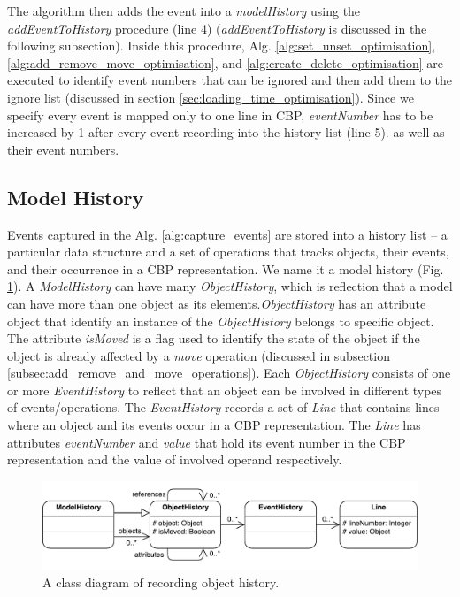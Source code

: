 \documentclass{llncs}
\begin{document}
The algorithm then adds the event into a \emph{modelHistory} using the \emph{addEventToHistory} procedure (line 4) (\emph{addEventToHistory} is discussed in the following subsection). Inside this procedure, Alg. \ref{alg:set_unset_optimisation}, \ref{alg:add_remove_move_optimisation}, and  \ref{alg:create_delete_optimisation} are executed to identify event numbers that can be ignored and then add them to the ignore list (discussed in section \ref{sec:loading_time_optimisation}). Since we specify every event is mapped only to one line in CBP, \emph{eventNumber} has to be increased by 1 after every event recording into the history list (line 5). as well as their event numbers.

\subsection{Model History}
\label{subsec:model_history}
Events captured in the Alg. \ref{alg:capture_events} are stored into a  history list -- a particular data structure and a set of operations that tracks objects, their events, and their  occurrence in a CBP representation. We name it a model history (Fig. \ref{fig:object_history}). A \emph{ModelHistory} can have many \emph{ObjectHistory}, which is reflection that a model can have more than one object as its elements.\emph{ObjectHistory} has an attribute object that identify an instance of the \emph{ObjectHistory} belongs to specific object. The attribute \emph{isMoved} is a flag used to identify the state of the object if the object is already affected by a \emph{move} operation (discussed in subsection \ref{subsec:add_remove_and_move_operations}). Each \emph{ObjectHistory} consists of one or more \emph{EventHistory} to reflect that an object can be involved in different types of events/operations. The \emph{EventHistory} records a set of \emph{Line} that contains lines where an object and its events occur in a CBP representation. The \emph{Line} has attributes \emph{eventNumber} and \emph{value} that hold its event number in the CBP representation and the value of involved operand respectively.

\begin{figure}[ht]
\centering
\includegraphics[width=\linewidth]{object_history}
\caption{A class diagram of recording object history.}
\label{fig:object_history}
\end{figure}
\end{document}

